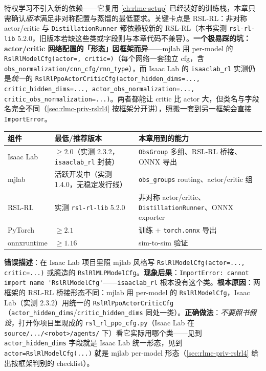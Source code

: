 特权学习不引入新的依赖——它复用 \cref{ch:rlmc-setup} 已经装好的训练栈，本章只需确认\emph{版本}满足非对称配置与蒸馏的最低要求。关键卡点是 RSL-RL：非对称 actor/critic 与 \verb|DistillationRunner| 都依赖较新的 RSL-RL（本书实测 \verb|rsl-rl-lib| 5.2.0，旧版本若缺这些类或字段则与本章代码不兼容）。\textbf{一个极易踩的坑：actor/critic 网络配置的「形态」因框架而异}——mjlab 用 per-model 的 \verb|RslRlModelCfg(actor=, critic=)|（每个网络一套独立 cfg，含 \verb|obs_normalization/cnn_cfg/rnn_type|），而 Isaac Lab 的 \verb|isaaclab_rl| 实测仍是\emph{统一}的 \verb|RslRlPpoActorCriticCfg(actor_hidden_dims=..., critic_hidden_dims=..., actor_obs_normalization=..., critic_obs_normalization=...)|。两者都能让 critic 比 actor 大，但类名与字段名完全不同（\cref{sec:rlmc-priv-rslrl4} 按框架分开讲），照搬一套到另一框架会直接 \verb|ImportError|。

\begin{center}
\small
\begin{tabular}{@{}lll@{}}
\toprule
组件 & 最低/推荐版本 & 本章用到的能力 \\
\midrule
Isaac Lab & $\ge 2.0$（实测 2.3.2，\verb|isaaclab_rl| 封装） & \verb|ObsGroup| 多组、RSL-RL 桥接、ONNX 导出 \\
mjlab & 活跃开发中（实测 1.4.0，无稳定发行线） & \verb|obs_groups| routing、actor/critic 组 \\
RSL-RL & 实测 \verb|rsl-rl-lib| 5.2.0 & 非对称 actor/critic、\verb|DistillationRunner|、ONNX exporter \\
PyTorch & $\ge 2.1$ & 训练 + \verb|torch.onnx| 导出 \\
onnxruntime & $\ge 1.16$ & sim-to-sim 验证 \\
\bottomrule
\end{tabular}
\end{center}

\begin{pitfall}
\textbf{错误描述}：在 Isaac Lab 项目里照 mjlab 风格写 \verb|RslRlModelCfg(actor=..., critic=...)| 或臆造的 \verb|RslRlMLPModelCfg|。\textbf{现象后果}：\verb|ImportError: cannot import name 'RslRlModelCfg'|——\verb|isaaclab_rl| 根本没有这个类。\textbf{根本原因}：两框架的 RSL-RL 桥接形态不同：mjlab 用 per-model 的 \verb|RslRlModelCfg|，Isaac Lab（实测 2.3.2）用统一的 \verb|RslRlPpoActorCriticCfg|（\verb|actor_hidden_dims|/\verb|critic_hidden_dims| 同处一类）。\textbf{正确做法}：\emph{不要照书假设}，打开你项目里现成的 \verb|rsl_rl_ppo_cfg.py|（Isaac Lab 在 \verb|source/.../<robot>/agents/| 下）看它实际用哪个类——见到 \verb|actor_hidden_dims| 字段就是 Isaac Lab 统一形态，见到 \verb|actor=RslRlModelCfg(...)| 就是 mjlab per-model 形态（\cref{sec:rlmc-priv-rslrl4} 给出按框架判别的 checklist）。
\end{pitfall}

